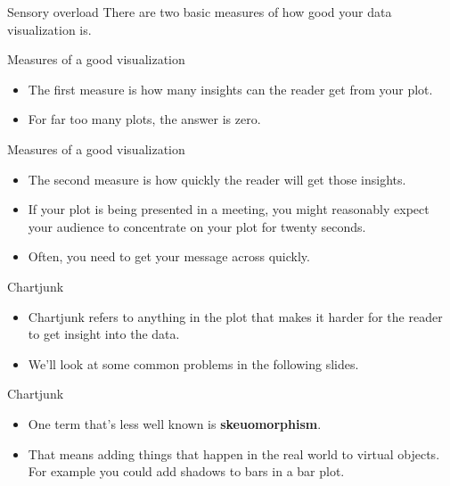 \documentclass[
  ignorenonframetext,
]{beamer}
\begin{document}
\begin{frame}{Sensory overload}
\label{sensory-overload}
There are two basic measures of how good your data visualization is.
\end{frame}

\begin{frame}{Measures of a good visualization}
\label{measures-of-a-good-visualization}
\begin{itemize}
\item
  The first measure is how many insights can the reader get from your
  plot.
\item
  For far too many plots, the answer is zero.
\end{itemize}
\end{frame}

\begin{frame}{Measures of a good visualization}
\label{measures-of-a-good-visualization-1}
\begin{itemize}
\item
  The second measure is how quickly the reader will get those insights.
\item
  If your plot is being presented in a meeting, you might reasonably
  expect your audience to concentrate on your plot for twenty seconds.
\item
  Often, you need to get your message across quickly.
\end{itemize}
\end{frame}

\begin{frame}{Chartjunk}
\label{chartjunk}
\begin{itemize}
\item
  Chartjunk refers to anything in the plot that makes it harder for the
  reader to get insight into the data.
\item
  We'll look at some common problems in the following slides.
\end{itemize}
\end{frame}

\begin{frame}{Chartjunk}
\label{chartjunk-1}
\begin{itemize}
\item
  One term that's less well known is \textbf{skeuomorphism}.
\item
  That means adding things that happen in the real world to virtual
  objects. For example you could add shadows to bars in a bar plot.
\end{itemize}
\end{frame}
\end{document}
